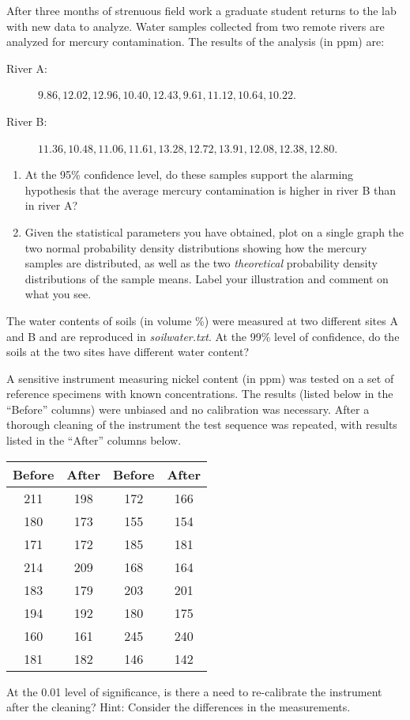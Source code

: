 \begin{problem}
After three months of strenuous field work a graduate student returns to the lab with new data to analyze.
Water samples collected from two remote rivers are analyzed for mercury contamination.  The
results of the analysis (in ppm) are:
\begin{description}
\item [River A:] $9.86, 12.02, 12.96, 10.40, 12.43, 9.61, 11.12, 10.64, 10.22$.
\item [River B:] $11.36, 10.48, 11.06, 11.61, 13.28, 12.72, 13.91, 12.08, 12.38, 12.80$.
\end{description}
\begin{enumerate}[label=\alph*)]
\item At the 95\% confidence level, do these samples support the alarming hypothesis that the average
mercury contamination is higher in river B than in river A?
\item Given the statistical
parameters you have obtained, plot on a single graph the two normal probability density distributions showing
how the mercury samples are distributed, as well as the two \emph{theoretical} probability density distributions of
the sample means.  Label your illustration and comment on what you see.
\end{enumerate}
\end{problem}

\begin{problem}
	The water contents of soils (in volume \%) were measured at two different sites A and B
	and are reproduced in \emph{soilwater.txt}.
At the 99\% level of confidence, do the soils at the two sites have different water content?
\end{problem}

\begin{problem}
A sensitive instrument measuring nickel content (in ppm)  was tested on a set of reference
specimens with known concentrations.  The results (listed below in the ``Before'' columns) were
unbiased and no calibration was necessary.  After a thorough cleaning of the instrument the test
sequence was repeated, with results listed in the ``After'' columns below.
\begin{table}[H]
\centering
\begin{tabular}{|c|c||c|c|} \hline
\bf{Before} & \bf{After} &  \bf{Before} & \bf{After} \\ \hline
211	&	198	&	172	&	166 \\
180	&	173	&	155	&	154 \\
171	&	172	&	185	&	181 \\
214	&	209	&	168	&	164 \\
183	&	179	&	203	&	201 \\
194	&	192	&	180	&	175 \\
160	&	161	&	245	&	240 \\
181	&	182	&	146	&	142 \\ \hline
\end{tabular}
\end{table}
\noindent
At the 0.01 level of significance, is there a need to re-calibrate the instrument after the cleaning?
Hint: Consider the differences in the measurements.
\end{problem}

